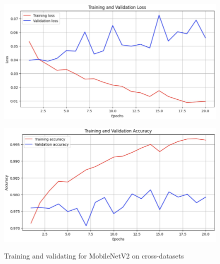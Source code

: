 \documentclass[rebuttal]{cvpr}
\begin{document}

\begin{figure}[t]
\centering
\begin{minipage}{0.45\linewidth}
   \includegraphics[width=\linewidth]{images/mobilenetv2_cd_loss.jpg}
   \label{fig:image1}
\end{minipage}
\hfill
\begin{minipage}{0.45\linewidth}
   \includegraphics[width=\linewidth]{images/mobilenetv2_cd_acc.jpg}
   \label{fig:image2}
\end{minipage}
\caption{Training and validating for MobileNetV2 on cross-datasets}
\label{fig:mobilenetv2_cd}
\end{figure}
\end{document}
